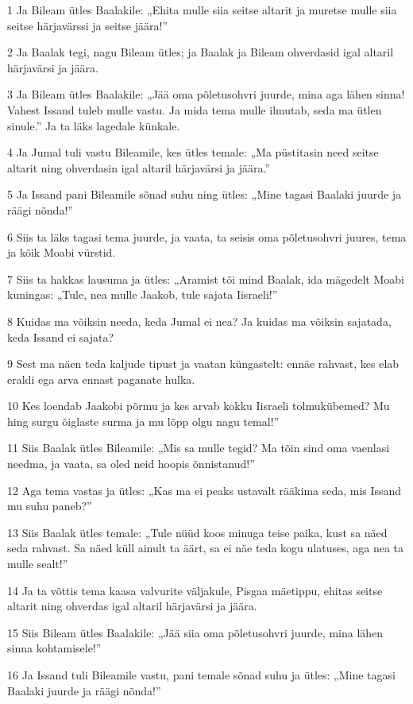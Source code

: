 \par 1 Ja Bileam ütles Baalakile: „Ehita mulle siia seitse altarit ja muretse mulle siia seitse härjavärssi ja seitse jäära!”
\par 2 Ja Baalak tegi, nagu Bileam ütles; ja Baalak ja Bileam ohverdasid igal altaril härjavärsi ja jäära.
\par 3 Ja Bileam ütles Baalakile: „Jää oma põletusohvri juurde, mina aga lähen sinna! Vahest Issand tuleb mulle vastu. Ja mida tema mulle ilmutab, seda ma ütlen sinule.” Ja ta läks lagedale künkale.
\par 4 Ja Jumal tuli vastu Bileamile, kes ütles temale: „Ma püstitasin need seitse altarit ning ohverdasin igal altaril härjavärsi ja jäära.”
\par 5 Ja Issand pani Bileamile sõnad suhu ning ütles: „Mine tagasi Baalaki juurde ja räägi nõnda!”
\par 6 Siis ta läks tagasi tema juurde, ja vaata, ta seisis oma põletusohvri juures, tema ja kõik Moabi vürstid.
\par 7 Siis ta hakkas lausuma ja ütles: „Aramist tõi mind Baalak, ida mägedelt Moabi kuningas: „Tule, nea mulle Jaakob, tule sajata Iisraeli!”
\par 8 Kuidas ma võiksin needa, keda Jumal ei nea? Ja kuidas ma võiksin sajatada, keda Issand ei sajata?
\par 9 Sest ma näen teda kaljude tipust ja vaatan küngastelt: ennäe rahvast, kes elab eraldi ega arva ennast paganate hulka.
\par 10 Kes loendab Jaakobi põrmu ja kes arvab kokku Iisraeli tolmukübemed? Mu hing surgu õiglaste surma ja mu lõpp olgu nagu temal!”
\par 11 Siis Baalak ütles Bileamile: „Mis sa mulle tegid? Ma tõin sind oma vaenlasi needma, ja vaata, sa oled neid hoopis õnnistanud!”
\par 12 Aga tema vastas ja ütles: „Kas ma ei peaks ustavalt rääkima seda, mis Issand mu suhu paneb?”
\par 13 Siis Baalak ütles temale: „Tule nüüd koos minuga teise paika, kust sa näed seda rahvast. Sa näed küll ainult ta äärt, sa ei näe teda kogu ulatuses, aga nea ta mulle sealt!”
\par 14 Ja ta võttis tema kaasa valvurite väljakule, Pisgaa mäetippu, ehitas seitse altarit ning ohverdas igal altaril härjavärsi ja jäära.
\par 15 Siis Bileam ütles Baalakile: „Jää siia oma põletusohvri juurde, mina lähen sinna kohtamisele!”
\par 16 Ja Issand tuli Bileamile vastu, pani temale sõnad suhu ja ütles: „Mine tagasi Baalaki juurde ja räägi nõnda!”
